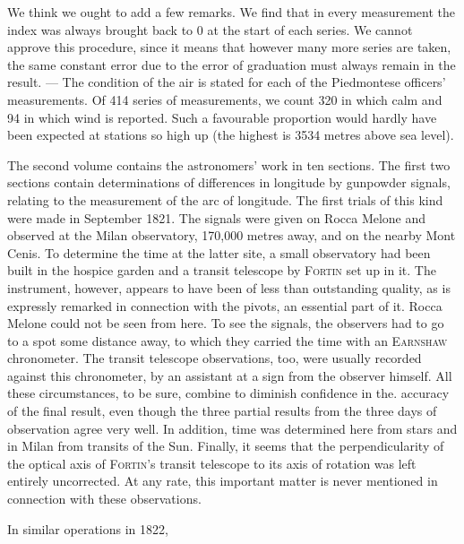 \par
{}%
We think we ought to add a few remarks. We find that in every measurement the index was always brought back to 0 at the start of each series. We cannot approve this procedure, since it means that however many more series are taken, the same constant error due to the error of graduation must always remain in the result. --- The condition of the air is stated for each of the Piedmontese officers' measurements. Of 414 series of measurements, we count 320 in which calm and 94 in which wind is reported. Such a favourable proportion would hardly have been expected at stations so high up (the highest is 3534 metres above sea level).

The second volume contains the astronomers' work in ten sections. The first two sections contain determinations of differences in longitude by gunpowder signals, relating to the measurement of the arc of longitude. The first trials of this kind were made in September 1821. The signals were given on Rocca Melone and observed at the Milan observatory, 170,000 metres away, and on the nearby Mont Cenis. To determine the time at the latter site, a small observatory had been built in the hospice garden and a transit telescope by \textsc{Fortin} set up in it. The instrument, however, appears to have been of less than outstanding quality, as is expressly remarked in connection with the pivots, an essential part of it. Rocca Melone could not be seen from here. To see the signals, the observers had to go to a spot some distance away, to which they carried the time with an \textsc{Earnshaw} chronometer. The transit telescope observations, too, were usually recorded against this chronometer, by an assistant at a sign from the observer himself. All these circumstances, to be sure, combine to diminish confidence in the. accuracy of the final result, even though the three partial results from the three days of observation agree very well. In addition, time was determined here from stars and in Milan from transits of the Sun. Finally, it seems that the perpendicularity of the optical axis of \textsc{Fortin}'s transit telescope to its axis of rotation was left entirely uncorrected. At any rate, this important matter is never mentioned in connection with these observations.

In similar operations in 1822,
